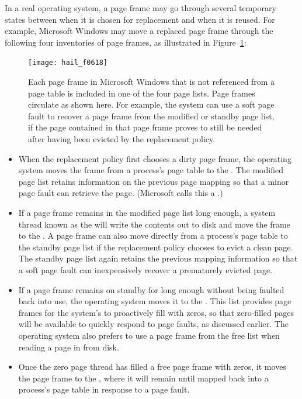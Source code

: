 In a real operating system, a page frame may go through several
temporary states between when it is chosen for replacement and when it
is reused.  For example, Microsoft Windows may move a replaced page
frame through the following four inventories of page frames, as
illustrated in Figure~\ref{scan-6-11}:
\begin{figure}
\centerline{\texttt{[image: hail\_f0618]}}
\caption{Each page frame in Microsoft Windows that is not referenced from
  a page table is included in one of the four page lists.  Page frames
  circulate as shown here.  For example, the system can use a soft
  page fault to recover a page frame from the modified or standby page
  list, if the page contained in that page frame proves to still be
  needed after having been evicted by the replacement policy.}
\label{scan-6-11}
\end{figure}
\begin{itemize}
\item
When the replacement policy first chooses a dirty page frame, the
operating system moves
the frame from a process's page table to the .  The
modified page list retains information on the previous page mapping
so that a minor page fault can retrieve the page.  (Microsoft calls this a
.)
\item
If a page frame remains in the
modified page list long enough, a system thread known as the  will write the contents out to disk and move the frame to
the .  A page frame can also move directly from a
process's page table to the standby page list if the replacement
policy chooses to evict a clean page.  The standby page list again
retains the previous mapping information so that a soft page fault
can inexpensively recover a prematurely evicted page.
\item
If a page frame remains on standby for long enough without being
faulted back into use, the operating system moves it to the . This list provides page frames for the system's 
to proactively fill with zeros, so that zero-filled pages will be
available to quickly respond to page faults, as discussed earlier.
The operating system also prefers to use a page frame from the free
list when reading a page in from disk.
\item
Once the zero page thread has filled a free page frame with zeros, it
moves the page frame to the , where it will remain until
mapped back into a process's page table in response to a page fault.
\end{itemize}


